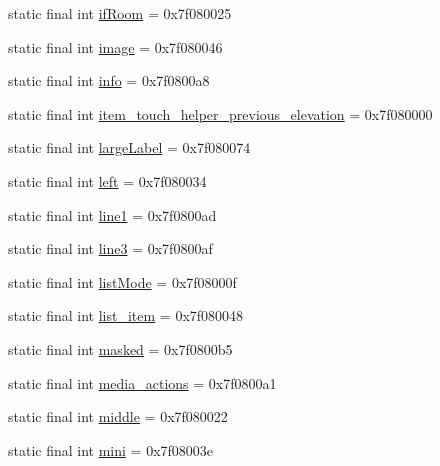 \begin{CompactItemize}
\item 
static final int \hyperlink{classandroid_1_1support_1_1coreutils_1_1_r_1_1id_68edb0a08f3b1621e796c9b01d1effaa}{ifRoom} = 0x7f080025
\item 
static final int \hyperlink{classandroid_1_1support_1_1coreutils_1_1_r_1_1id_45f3dad88a3a94304f99c1464c363c1f}{image} = 0x7f080046
\item 
static final int \hyperlink{classandroid_1_1support_1_1coreutils_1_1_r_1_1id_37fe7871b6c3c339ca383c49bba61f7c}{info} = 0x7f0800a8
\item 
static final int \hyperlink{classandroid_1_1support_1_1coreutils_1_1_r_1_1id_db543b7845996ed252c328f3e6b8cb21}{item\_\-touch\_\-helper\_\-previous\_\-elevation} = 0x7f080000
\item 
static final int \hyperlink{classandroid_1_1support_1_1coreutils_1_1_r_1_1id_7d728a228b988788857b04bb86ec70ed}{largeLabel} = 0x7f080074
\item 
static final int \hyperlink{classandroid_1_1support_1_1coreutils_1_1_r_1_1id_f6e1aaed4f979bc982002314e83d3718}{left} = 0x7f080034
\item 
static final int \hyperlink{classandroid_1_1support_1_1coreutils_1_1_r_1_1id_3a9880ffff36fba9e1edda36b74bab73}{line1} = 0x7f0800ad
\item 
static final int \hyperlink{classandroid_1_1support_1_1coreutils_1_1_r_1_1id_ffaaa69f8551249ba2b6dec4a5d91751}{line3} = 0x7f0800af
\item 
static final int \hyperlink{classandroid_1_1support_1_1coreutils_1_1_r_1_1id_bb13dbf1afa1c4fd3cf4f8e560e0073a}{listMode} = 0x7f08000f
\item 
static final int \hyperlink{classandroid_1_1support_1_1coreutils_1_1_r_1_1id_0474b4280e06dc3729d9ae0e6ec16113}{list\_\-item} = 0x7f080048
\item 
static final int \hyperlink{classandroid_1_1support_1_1coreutils_1_1_r_1_1id_306bad2344e09611c157cdfc0a7ed5e4}{masked} = 0x7f0800b5
\item 
static final int \hyperlink{classandroid_1_1support_1_1coreutils_1_1_r_1_1id_7d1fcbcc97bced94d3530f4e72bea2df}{media\_\-actions} = 0x7f0800a1
\item 
static final int \hyperlink{classandroid_1_1support_1_1coreutils_1_1_r_1_1id_22de99b57d349db59cca060b7e3e7019}{middle} = 0x7f080022
\item 
static final int \hyperlink{classandroid_1_1support_1_1coreutils_1_1_r_1_1id_f978b6286a3f8ff701d1f0e3053f59e7}{mini} = 0x7f08003e
\item 

\end{CompactItemize}
